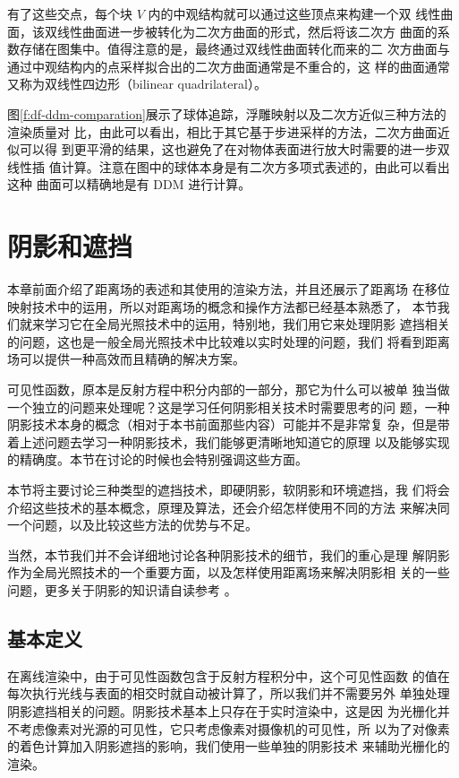 有了这些交点，每个块 $V$ 内的中观结构就可以通过这些顶点来构建一个双 线性曲面，该双线性曲面进一步被转化为二次方曲面的形式，然后将该二次方 曲面的系数存储在图集中。值得注意的是，最终通过双线性曲面转化而来的二 次方曲面与通过中观结构内的点采样拟合出的二次方曲面通常是不重合的，这 样的曲面通常又称为双线性四边形（bilinear quadrilateral）。

图\ref{f:df-ddm-comparation}展示了球体追踪，浮雕映射以及二次方近似三种方法的渲染质量对 比，由此可以看出，相比于其它基于步进采样的方法，二次方曲面近似可以得 到更平滑的结果，这也避免了在对物体表面进行放大时需要的进一步双线性插 值计算。注意在图中的球体本身是有二次方多项式表述的，由此可以看出这种 曲面可以精确地是有 DDM 进行计算。




\section{阴影和遮挡}
本章前面介绍了距离场的表述和其使用的渲染方法，并且还展示了距离场 在移位映射技术中的运用，所以对距离场的概念和操作方法都已经基本熟悉了， 本节我们就来学习它在全局光照技术中的运用，特别地，我们用它来处理阴影 遮挡相关的问题，这也是一般全局光照技术中比较难以实时处理的问题，我们 将看到距离场可以提供一种高效而且精确的解决方案。

可见性函数，原本是反射方程中积分内部的一部分，那它为什么可以被单 独当做一个独立的问题来处理呢？这是学习任何阴影相关技术时需要思考的问 题，一种阴影技术本身的概念（相对于本书前面那些内容）可能并不是非常复 杂，但是带着上述问题去学习一种阴影技术，我们能够更清晰地知道它的原理 以及能够实现的精确度。本节在讨论的时候也会特别强调这些方面。

本节将主要讨论三种类型的遮挡技术，即硬阴影，软阴影和环境遮挡，我 们将会介绍这些技术的基本概念，原理及算法，还会介绍怎样使用不同的方法 来解决同一个问题，以及比较这些方法的优势与不足。

当然，本节我们并不会详细地讨论各种阴影技术的细节，我们的重心是理 解阴影作为全局光照技术的一个重要方面，以及怎样使用距离场来解决阴影相 关的一些问题，更多关于阴影的知识请自读参考 \cite{b:rts}。




\subsection{基本定义}
在离线渲染中，由于可见性函数包含于反射方程积分中，这个可见性函数 的值在每次执行光线与表面的相交时就自动被计算了，所以我们并不需要另外 单独处理阴影遮挡相关的问题。阴影技术基本上只存在于实时渲染中，这是因 为光栅化并不考虑像素对光源的可见性，它只考虑像素对摄像机的可见性，所 以为了对像素的着色计算加入阴影遮挡的影响，我们使用一些单独的阴影技术 来辅助光栅化的渲染。

